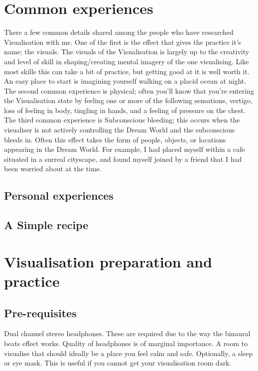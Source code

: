 \documentclass{article}
\begin{document}
\section{Common experiences}
There a few common details shared among the people who have researched Visualisation with me. One of the first is the effect that gives the practice it's name; the visuals. The visuals of the Visualisation is largely up to the creativity and level of skill in shaping/creating mental imagery of the one visualising. Like most skills this can take a bit of practice, but getting good at it is well worth it. An easy place to start is imagining yourself walking on a placid ocean at night. The second common experience is physical; often you'll know that you're entering the Visualisation state by feeling one or more of the following sensations, vertigo, loss of feeling in body, tingling in hands, and a feeling of pressure on the chest. The third common experience is Subconscious bleeding; this occurs when the visualiser is not actively controlling the Dream World and the subconscious bleeds in. Often this effect takes the form of people, objects, or locations appearing in the Dream World. For example, I had placed myself within a cafe situated in a surreal cityscape, and found myself joined by a friend that I had been worried about at the time.

\subsection{}

\subsection{Personal experiences}

\subsection{A Simple recipe}

\section{Visualisation preparation and practice}

\subsection{Pre-requisites}
Dual channel stereo headphones. These are required due to the way the binaural beats effect works. Quality of headphones is of marginal importance.
A room to visualise that should ideally be a place you feel calm and safe.
Optionally, a sleep or eye mask. This is useful if you cannot get your visualisation room dark.
\end{document}
